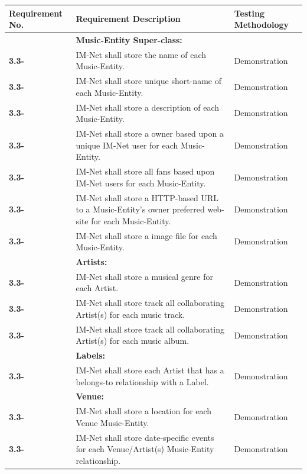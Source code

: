 \documentclass[letterpaper,12pt]{article}
\newcounter{rcounter}							%
\newcommand\rnumber{\stepcounter{rcounter}\arabic{rcounter}}
\begin{document}
{\setcounter{rcounter}{0}
\begin{center}
\begin{tabular}{|l|p{4in}|p{2in}|}
\hline 
Requirement No. & Requirement Description & Testing Methodology \\ 
\hline
& \textbf{Music-Entity Super-class:} & \\
\hline
\textbf{3.3-\rnumber} & IM-Net shall store the name of each Music-Entity. & Demonstration \\ 
\hline
\textbf{3.3-\rnumber} & IM-Net shall store unique short-name of each Music-Entity. & Demonstration \\ 
\hline 
\textbf{3.3-\rnumber} & IM-Net shall store a description of each Music-Entity. & Demonstration \\ 
\hline 
\textbf{3.3-\rnumber} & IM-Net shall store a owner based upon a unique IM-Net user for each Music-Entity. & Demonstration \\ 
\hline 
\textbf{3.3-\rnumber} & IM-Net shall store all fans based upon IM-Net users for each Music-Entity. & Demonstration \\ 
\hline 
\textbf{3.3-\rnumber} & IM-Net shall store a HTTP-based URL to a Music-Entity's owner preferred web-site for each Music-Entity. & Demonstration \\ 
\hline
\textbf{3.3-\rnumber} & IM-Net shall store a image file for each Music-Entity. & Demonstration \\ 
\hline
& \textbf{Artists:} & \\
\hline
\textbf{3.3-\rnumber} & IM-Net shall store a musical genre for each Artist. & Demonstration \\ 
\hline 
\textbf{3.3-\rnumber} & IM-Net shall store track all collaborating Artist(s) for each music track. & Demonstration \\ 
\hline
\textbf{3.3-\rnumber} & IM-Net shall store track all collaborating Artist(s) for each music album. & Demonstration \\ 
\hline
& \textbf{Labels:} & \\
\hline
\textbf{3.3-\rnumber} & IM-Net shall store each Artist that has a belongs-to relationship with a Label. & Demonstration \\ 
\hline 
& \textbf{Venue:} & \\
\hline
\textbf{3.3-\rnumber} & IM-Net shall store a location for each Venue Music-Entity. & Demonstration \\ 
\hline 
\textbf{3.3-\rnumber} & IM-Net shall store date-specific events for each Venue/Artist(s) Music-Entity relationship. & Demonstration \\ 
\hline


\end{tabular}
\end{center}}
\end{document}
